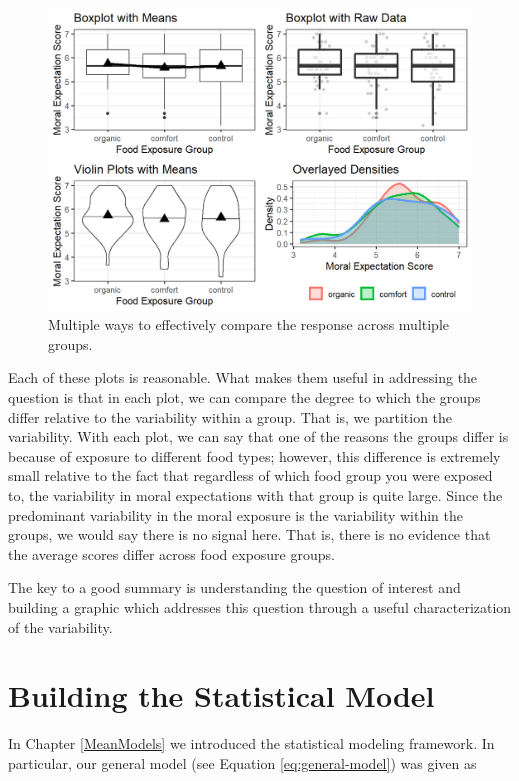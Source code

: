 \documentclass[
]{book}
\theoremstyle{plain}
\theoremstyle{mydefn}
\theoremstyle{myexmpl}
\theoremstyle{remark}
\begin{document}
\begin{figure}

{\centering \includegraphics[width=0.8\linewidth]{./Images/anovasummaries-organic-comparison-1} 

}

\caption{Multiple ways to effectively compare the response across multiple groups.}\label{fig:anovasummaries-organic-comparison}
\end{figure}

Each of these plots is reasonable. What makes them useful in addressing the question is that in each plot, we can compare the degree to which the groups differ relative to the variability within a group. That is, we partition the variability. With each plot, we can say that one of the reasons the groups differ is because of exposure to different food types; however, this difference is extremely small relative to the fact that regardless of which food group you were exposed to, the variability in moral expectations with that group is quite large. Since the predominant variability in the moral exposure is the variability within the groups, we would say there is no signal here. That is, there is no evidence that the average scores differ across food exposure groups.

The key to a good summary is understanding the question of interest and building a graphic which addresses this question through a useful characterization of the variability.

\hypertarget{ANOVAmodel}{%
\chapter{Building the Statistical Model}\label{ANOVAmodel}}

In Chapter \ref{MeanModels} we introduced the statistical modeling framework. In particular, our general model (see Equation \eqref{eq:general-model}) was given as
\end{document}
